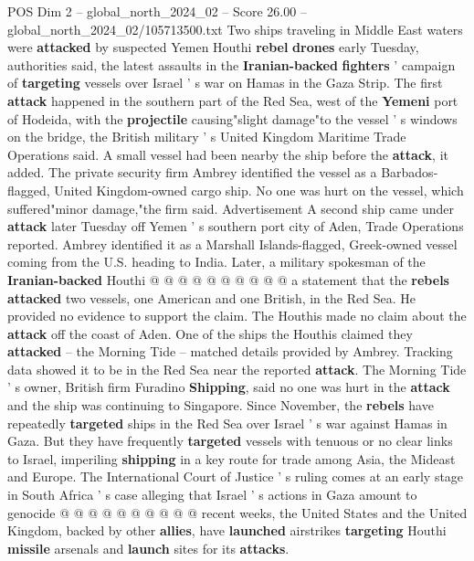 \begin{textsample}{POS Dim 2 – global\_north\_2024\_02 – Score 26.00 – global\_north\_2024\_02/105713500.txt}  \label{ex:f2_pos_266}
Two ships traveling in Middle East waters were \textbf{attacked} by suspected Yemen Houthi \textbf{rebel} \textbf{drones} early Tuesday, authorities said, the latest assaults in the \textbf{Iranian-backed} \textbf{fighters} ' campaign of \textbf{targeting} vessels over Israel ' s war on Hamas in the Gaza Strip.
The first \textbf{attack} happened in the southern part of the Red Sea, west of the \textbf{Yemeni} port of Hodeida, with the \textbf{projectile} causing"slight damage"to the vessel ' s windows on the bridge, the British military ' s United Kingdom Maritime Trade Operations said.
A small vessel had been nearby the ship before the \textbf{attack}, it added.
The private security firm Ambrey identified the vessel as a Barbados-flagged, United Kingdom-owned cargo ship.
No one was hurt on the vessel, which suffered"minor damage,"the firm said.
Advertisement A second ship came under \textbf{attack} later Tuesday off Yemen ' s southern port city of Aden, Trade Operations reported.
Ambrey identified it as a Marshall Islands-flagged, Greek-owned vessel coming from the U.S. heading to India.
Later, a military spokesman of the \textbf{Iranian-backed} Houthi @ @ @ @ @ @ @ @ @ @ a statement that the \textbf{rebels} \textbf{attacked} two vessels, one American and one British, in the Red Sea.
He provided no evidence to support the claim.
The Houthis made no claim about the \textbf{attack} off the coast of Aden.
One of the ships the Houthis claimed they \textbf{attacked} -- the Morning Tide -- matched details provided by Ambrey.
Tracking data showed it to be in the Red Sea near the reported \textbf{attack}.
The Morning Tide ' s owner, British firm Furadino \textbf{Shipping}, said no one was hurt in the \textbf{attack} and the ship was continuing to Singapore.
Since November, the \textbf{rebels} have repeatedly \textbf{targeted} ships in the Red Sea over Israel ' s war against Hamas in Gaza.
But they have frequently \textbf{targeted} vessels with tenuous or no clear links to Israel, imperiling \textbf{shipping} in a key route for trade among Asia, the Mideast and Europe.
The International Court of Justice ' s ruling comes at an early stage in South Africa ' s case alleging that Israel ' s actions in Gaza amount to genocide @ @ @ @ @ @ @ @ @ @ recent weeks, the United States and the United Kingdom, backed by other \textbf{allies}, have \textbf{launched} airstrikes \textbf{targeting} Houthi \textbf{missile} arsenals and \textbf{launch} sites for its \textbf{attacks}.

\end{textsample}
